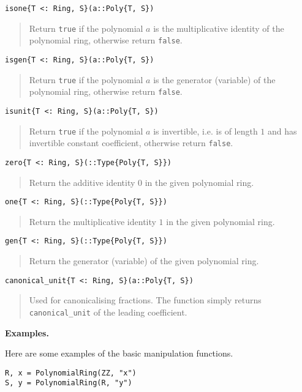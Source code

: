 \documentclass[a4paper,10pt]{article}
\newcommand{\code}{\lstinline}
\newcommand{\desc}[1]{\vspace{-3mm}\begin{quote}#1\end{quote}}
\begin{document}
{{\begin{lstlisting}
isone{T <: Ring, S}(a::Poly{T, S})
\end{lstlisting}

\desc{Return \code{true} if the polynomial $a$ is the multiplicative identity
of the polynomial ring, otherwise return \code{false}.}

\begin{lstlisting}
isgen{T <: Ring, S}(a::Poly{T, S})
\end{lstlisting}

\desc{Return \code{true} if the polynomial $a$ is the generator (variable) of the
polynomial ring, otherwise return \code{false}.}

\begin{lstlisting}
isunit{T <: Ring, S}(a::Poly{T, S})
\end{lstlisting}

\desc{Return \code{true} if the polynomial $a$ is invertible, i.e. is of length
$1$ and has invertible constant coefficient, otherwise return \code{false}.}

\begin{lstlisting}
zero{T <: Ring, S}(::Type{Poly{T, S}})
\end{lstlisting}

\desc{Return the additive identity $0$ in the given polynomial ring.}

\begin{lstlisting}
one{T <: Ring, S}(::Type{Poly{T, S}})
\end{lstlisting}

\desc{Return the multiplicative identity $1$ in the given polynomial ring.}

\begin{lstlisting}
gen{T <: Ring, S}(::Type{Poly{T, S}})
\end{lstlisting}

\desc{Return the generator (variable) of the given polynomial ring.}

\begin{lstlisting}
canonical_unit{T <: Ring, S}(a::Poly{T, S})
\end{lstlisting}

\desc{Used for canonicalising fractions. The function simply returns
\code{canonical_unit} of the leading coefficient.}

\textbf{Examples.}

Here are some examples of the basic manipulation functions.

\begin{lstlisting}
R, x = PolynomialRing(ZZ, "x")
S, y = PolynomialRing(R, "y")


\end{lstlisting}}}
\end{document}
